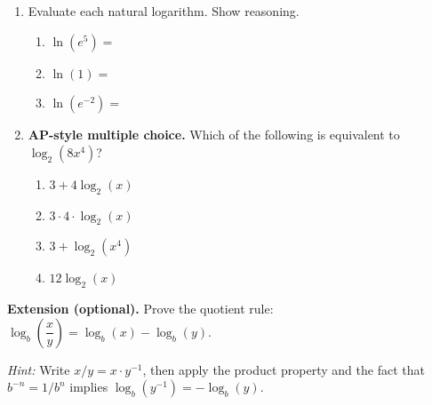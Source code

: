 \documentclass[10pt]{article}
\begin{document}
\begin{enumerate}[leftmargin=1.8em, itemsep=14pt]

\item Evaluate each natural logarithm. Show reasoning.

\begin{enumerate}[leftmargin=1.5em, itemsep=6pt, label=\alph*.]
  \item $\ln(e^5) = $ \blank{3cm}

  \item $\ln(1) = $ \blank{3cm}

  \item $\ln(e^{-2}) = $ \blank{3cm}
\end{enumerate}

\item \textbf{AP-style multiple choice.} Which of the following is equivalent to $\log_2(8x^4)$?

\vspace{6pt}
\begin{enumerate}[leftmargin=2em, itemsep=4pt, label=(\Alph*)]
  \item $3 + 4\log_2(x)$
  \item $3 \cdot 4 \cdot \log_2(x)$
  \item $3 + \log_2(x^4)$
  \item $12\log_2(x)$
\end{enumerate}

\end{enumerate}

\vspace{0.12in}

\begin{practicebox}
\textbf{Extension (optional).} Prove the quotient rule:
$\log_b\!\left(\dfrac{x}{y}\right) = \log_b(x) - \log_b(y)$.

\textit{Hint:} Write $x/y = x \cdot y^{-1}$, then apply the product property and the fact
that $b^{-n} = 1/b^n$ implies $\log_b(y^{-1}) = -\log_b(y)$.

\end{practicebox}
\end{document}
